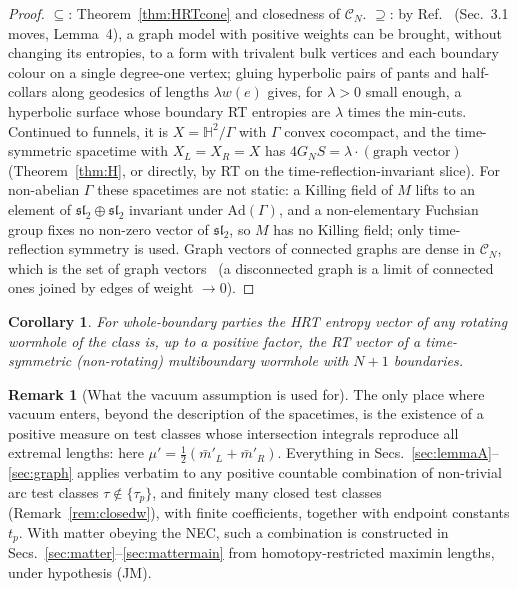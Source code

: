 \documentclass[aps,prd,onecolumn,superscriptaddress,nofootinbib,amsmath,amssymb,11pt]{revtex4-2}
\newtheorem{corollary}[theorem]{Corollary}
\theoremstyle{definition}
\newtheorem{remark}[theorem]{Remark}
\newcommand{\Hyp}{\mathbb{H}^2}
\newcommand{\CN}{\mathcal{C}_N}
\newcommand{\mbar}{\bar m}
\begin{document}
\begin{proof}
$\subseteq$: Theorem~\ref{thm:HRTcone} and closedness of $\CN$. $\supseteq$: by Ref.~\cite{Bao2015} (Sec.~3.1 moves, Lemma~4), a
graph model with positive weights can be brought, without changing its entropies, to a form with trivalent bulk vertices and
each boundary colour on a single degree-one vertex; gluing hyperbolic pairs of pants and half-collars along geodesics of lengths
$\lambda w(e)$ gives, for $\lambda>0$ small enough, a hyperbolic surface whose boundary RT entropies are $\lambda$ times the min-cuts.
Continued to funnels, it is $X=\Hyp/\Gamma$ with $\Gamma$ convex cocompact, and the time-symmetric spacetime with $X_L=X_R=X$ has
$4G_NS=\lambda\cdot(\text{graph vector})$ (Theorem~\ref{thm:H}, or directly, by RT on the time-reflection-invariant slice). For
non-abelian $\Gamma$ these spacetimes are not static: a Killing field of $M$ lifts to an element of $\mathfrak{sl}_2\oplus\mathfrak{sl}_2$
invariant under $\mathrm{Ad}(\Gamma)$, and a non-elementary Fuchsian group fixes no non-zero vector of $\mathfrak{sl}_2$, so $M$ has no
Killing field; only time-reflection symmetry is used. Graph vectors of connected graphs are dense in
$\CN$, which is the set of graph vectors~\cite{Bao2015} (a disconnected graph is a limit of connected ones joined by edges of
weight $\to0$).
\end{proof}

\begin{corollary}
For whole-boundary parties the HRT entropy vector of any rotating wormhole of the class is, up to a positive factor, the RT
vector of a time-symmetric (non-rotating) multiboundary wormhole with $N+1$ boundaries.
\end{corollary}

\begin{remark}[What the vacuum assumption is used for]\label{rem:vacuse}
The only place where vacuum enters, beyond the description of the spacetimes, is the existence of a positive measure on test
classes whose intersection integrals reproduce all extremal lengths: here $\mu'=\frac12(\mbar'_L+\mbar'_R)$. Everything in
Secs.~\ref{sec:lemmaA}--\ref{sec:graph} applies verbatim to any positive countable combination of non-trivial arc test classes
$\tau\notin\{\tau_p\}$, and finitely many closed test classes (Remark~\ref{rem:closedw}), with finite coefficients, together with endpoint
constants $t_p$. With matter obeying the NEC, such a combination is
constructed in Secs.~\ref{sec:matter}--\ref{sec:mattermain} from homotopy-restricted maximin lengths, under hypothesis (JM).
\end{remark}
\end{document}
